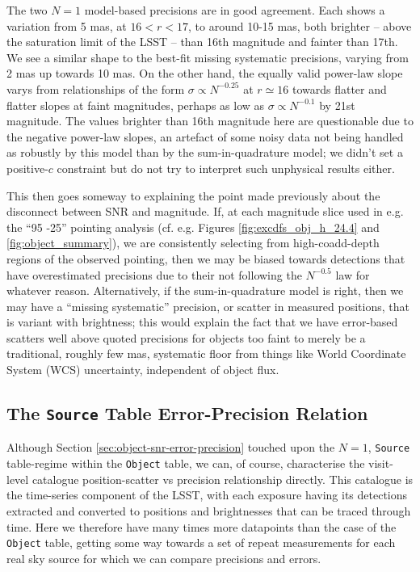 \documentclass[SE,lsstdraft,authoryear,toc]{lsstdoc}
\begin{document}
The two $N=1$ model-based precisions are in good agreement.
Each shows a variation from 5 mas, at $16 < r < 17$, to around 10-15 mas, both brighter -- above the saturation limit of the LSST -- than 16th magnitude and fainter than 17th.
We see a similar shape to the best-fit missing systematic precisions, varying from 2 mas up towards 10 mas.
On the other hand, the equally valid power-law slope varys from relationships of the form $\sigma \propto N^{-0.25}$ at $r\simeq16$ towards flatter and flatter slopes at faint magnitudes, perhaps as low as $\sigma \propto N^{-0.1}$ by 21st magnitude.
The values brighter than 16th magnitude here are questionable due to the negative power-law slopes, an artefact of some noisy data not being handled as robustly by this model than by the sum-in-quadrature model; we didn't set a positive-$c$ constraint but do not try to interpret such unphysical results either.

This then goes someway to explaining the point made previously about the disconnect between SNR and magnitude.
If, at each magnitude slice used in e.g. the ``95 -25'' pointing analysis (cf. e.g. Figures \ref{fig:excdfs_obj_h_24.4} and \ref{fig:object_summary}), we are consistently selecting from high-coadd-depth regions of the observed pointing, then we may be biased towards detections that have overestimated precisions due to their not following the $N^{-0.5}$ law for whatever reason.
Alternatively, if the sum-in-quadrature model is right, then we may have a ``missing systematic'' precision, or scatter in measured positions, that is variant with brightness; this would explain the fact that we have error-based scatters well above quoted precisions for objects too faint to merely be a traditional, roughly few mas, systematic floor from things like World Coordinate System (WCS) uncertainty, independent of object flux.

\subsection{The \texttt{Source} Table Error-Precision Relation}
Although Section \ref{sec:object-snr-error-precision} touched upon the $N=1$, \texttt{Source} table-regime within the \texttt{Object} table, we can, of course, characterise the visit-level catalogue position-scatter vs precision relationship directly.
This catalogue is the time-series component of the LSST, with each exposure having its detections extracted and converted to positions and brightnesses that can be traced through time.
Here we therefore have many times more datapoints than the case of the \texttt{Object} table, getting some way towards a set of repeat measurements for each real sky source for which we can compare precisions and errors.
\end{document}
